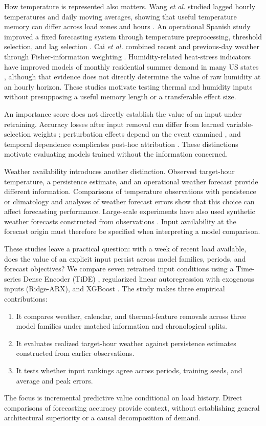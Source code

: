 \documentclass[conference]{IEEEtran}
\begin{document}
How temperature is represented also matters. Wang \emph{et al.} studied lagged hourly temperatures and daily moving averages, showing that useful temperature memory can differ across load zones and hours \cite{wang2016}. An operational Spanish study improved a fixed forecasting system through temperature preprocessing, threshold selection, and lag selection \cite{candela2022}. Cai \emph{et al.} combined recent and previous-day weather through Fisher-information weighting \cite{cai2018}. Humidity-related heat-stress indicators have improved models of monthly residential summer demand in many US states \cite{maia2020}, although that evidence does not directly determine the value of raw humidity at an hourly horizon. These studies motivate testing thermal and humidity inputs without presupposing a useful memory length or a transferable effect size.

An importance score does not directly establish the value of an input under retraining. Accuracy losses after input removal can differ from learned variable-selection weights \cite{nicola2026}; perturbation effects depend on the event examined \cite{gurses2022}, and temporal dependence complicates post-hoc attribution \cite{baur2024}. These distinctions motivate evaluating models trained without the information concerned.

Weather availability introduces another distinction. Observed target-hour temperature, a persistence estimate, and an operational weather forecast provide different information. Comparisons of temperature observations with persistence or climatology \cite{behmiri2023} and analyses of weather forecast errors \cite{fay2010} show that this choice can affect forecasting performance. Large-scale experiments have also used synthetic weather forecasts constructed from observations \cite{li2025}. Input availability at the forecast origin must therefore be specified when interpreting a model comparison.

These studies leave a practical question: with a week of recent load available, does the value of an explicit input persist across model families, periods, and forecast objectives? We compare seven retrained input conditions using a Time-series Dense Encoder (TiDE) \cite{das2023}, regularized linear autoregression with exogenous inputs (Ridge-ARX), and XGBoost \cite{chen2016}. The study makes three empirical contributions:
\begin{enumerate}
\item It compares weather, calendar, and thermal-feature removals across three model families under matched information and chronological splits.
\item It evaluates realized target-hour weather against persistence estimates constructed from earlier observations.
\item It tests whether input rankings agree across periods, training seeds, and average and peak errors.
\end{enumerate}
The focus is incremental predictive value conditional on load history. Direct comparisons of forecasting accuracy provide context, without establishing general architectural superiority or a causal decomposition of demand.
\end{document}
